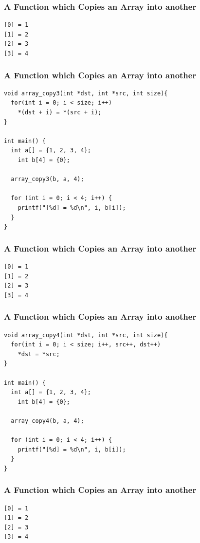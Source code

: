 \documentclass{../c-lecture}
\begin{document}
\begin{frame}[fragile]
  \frametitle{A Function which Copies an Array into another}
  \begin{verbatim}
[0] = 1
[1] = 2
[2] = 3
[3] = 4
  \end{verbatim}
\end{frame}

\begin{frame}[fragile]
  \frametitle{A Function which Copies an Array into another}
  \begin{verbatim}
void array_copy3(int *dst, int *src, int size){
  for(int i = 0; i < size; i++)
    *(dst + i) = *(src + i);
}

int main() {
  int a[] = {1, 2, 3, 4};
	int b[4] = {0};

  array_copy3(b, a, 4);

  for (int i = 0; i < 4; i++) {
    printf("[%d] = %d\n", i, b[i]);
  }
}
  \end{verbatim}
\end{frame}

\begin{frame}[fragile]
  \frametitle{A Function which Copies an Array into another}
  \begin{verbatim}
[0] = 1
[1] = 2
[2] = 3
[3] = 4
  \end{verbatim}
\end{frame}

\begin{frame}[fragile]
  \frametitle{A Function which Copies an Array into another}
  \begin{verbatim}
void array_copy4(int *dst, int *src, int size){
  for(int i = 0; i < size; i++, src++, dst++)
    *dst = *src;
}

int main() {
  int a[] = {1, 2, 3, 4};
	int b[4] = {0};

  array_copy4(b, a, 4);

  for (int i = 0; i < 4; i++) {
    printf("[%d] = %d\n", i, b[i]);
  }
}
  \end{verbatim}
\end{frame}

\begin{frame}[fragile]
  \frametitle{A Function which Copies an Array into another}
  \begin{verbatim}
[0] = 1
[1] = 2
[2] = 3
[3] = 4
  \end{verbatim}
\end{frame}
\end{document}
